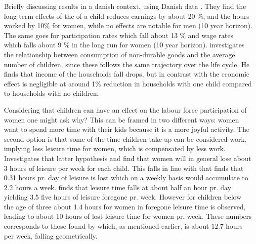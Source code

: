 Briefly discussing results in a danish context, using Danish data \textcite{kleven_children_2019}. They  find  the long term effects of the of a child reduces earnings by about 20 \%, and the hours worked by 10\% for women, while no effects are notable for men (10 year horizon). The same goes for participation rates which fall about 13 \% and wage rates which falls about 9 \% in the long run for women (10 year horizon). \textcite{jorgensen_life-cycle_2017} investigates the relationship between consumption of non-durable goods and the average number of children, since these follows the same trajectory over the life cycle. He finds that income of the households fall drops, but in contrast with \textcite{kleven_children_2019} the economic effect is negligible at around 1\% reduction in households with one child compared to households with no children. 

Considering that children can have an effect on the labour force participation of women one might ask why? This can be framed in two different ways: women want to spend more time with their kids because it is a more joyful activity. The second option is that some of the time children take up can be considered work, implying less leisure time for women, which is compensated by less work. \textcite{firestone_estimation_1988} Investigates that latter hypothesis and find that  women will in general lose about 3 hours of leisure per week for each child. This falls in line with \textcite{thrane_men_2000} that finds that 0.31 hours pr. day of leisure is lost which on a weekly basis would accumulate to 2.2 hours a week. \textcite{ekert-jaffe_time_2015} finds that leisure time falls at about half an hour pr. day yielding 3.5 five hours of leisure foregone pr. week. However for children below the age of three about 1.4 hours for women in foregone leisure time is observed, leading to about 10 hours of lost leisure time for women pr. week.  These numbers corresponds to those found by \textcite{hotz_empirical_1988} which, as mentioned earlier, is about $12.7$ hours per week, falling geometrically. 